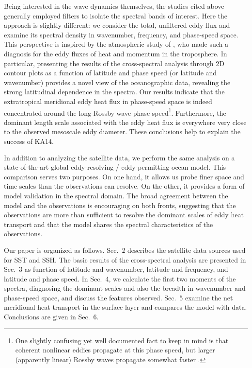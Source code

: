 \documentclass[10pt]{article}
\begin{document}
Being interested in the wave dynamics themselves, the studies cited above generally employed filters to isolate the spectral bands of interest. Here the approach is slightly different: we consider the total, unfiltered eddy flux and examine its spectral density in wavenumber, frequency, and phase-speed space. This perspective is inspired by the atmospheric study of \citet[][henceforth RH91]{RandelHeld1991}, who made such a diagnosis for the eddy fluxes of heat and momentum in the troposphere. In particular, presenting the results of the cross-spectral analysis through 2D contour plots as a function of latitude and phase speed (or latitude and wavenumber) provides a novel view of the oceanographic data, revealing the strong latitudinal dependence in the spectra. Our results indicate that the extratropical meridional eddy heat flux in phase-speed space is indeed concentrated around the long Rossby-wave phase speed\footnote{One slightly confusing yet well documented fact to keep in mind is  that coherent nonlinear eddies propagate at this phase speed, but larger (apparently linear) Rossby waves propagate somewhat faster \citep{CheltonEtAl2007,CheltonEtAl2011}.}. Furthermore, the dominant length scale associated with the eddy heat flux is everywhere very close to the observed mesoscale eddy diameter. These conclusions help to explain the success of KA14.

In addition to analyzing the satellite data, we perform the same analysis on a state-of-the-art global eddy-resolving / eddy-permitting ocean model. This comparison serves two purposes. On one hand, it allows us probe finer space and time scales than the observations can resolve. On the other, it provides a form of model validation in the spectral domain. The broad agreement between the model and the observations is encouraging on both fronts, suggesting that the observations are more than sufficient to resolve the dominant scales of eddy heat transport and that the model shares the spectral characteristics of the observations.


Our paper is organized as follows. Sec.~2 describes the satellite data sources used for SST and SSH. The basic results of the cross-spectral analysis are presented in Sec.~3 as function of latitude and wavenumber, latitude and frequency, and latitude and phase speed. In Sec.~4, we calculate the first two moments of the spectra, diagnosing the dominant scales and also the breadth in wavenumber and phase-speed space, and discuss the features observed. Sec.~5 examine the net meridional heat transport in the surface layer and compares the model with data. Conclusions are given in Sec.~6.
\end{document}
